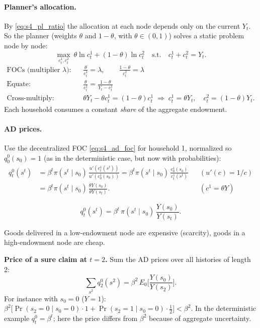 \paragraph{Planner's allocation.} By \eqref{eq:s4_pl_ratio} the allocation at each node depends only on the current $Y_t$. So the planner (weights $\theta$ and $1-\theta$, with $\theta\in(0,1)$) solves a static problem node by node:
\[
\max_{c^1_t,c^2_t}\ \theta\ln c^1_t+(1-\theta)\ln c^2_t\quad\text{s.t.}\quad c^1_t+c^2_t=Y_t .
\]
\begin{align*}
  \text{FOCs (multiplier $\lambda$):}&\quad \frac{\theta}{c^1_t}=\lambda,\qquad \frac{1-\theta}{c^2_t}=\lambda\\
  \text{Equate:}&\quad \frac{\theta}{c^1_t}=\frac{1-\theta}{Y_t-c^1_t}\\
  \text{Cross-multiply:}&\quad \theta Y_t-\theta c^1_t=(1-\theta)c^1_t\;\Rightarrow\; c^1_t=\theta Y_t,\quad c^2_t=(1-\theta)Y_t.
\end{align*}
Each household consumes a constant \emph{share} of the aggregate endowment.

\paragraph{AD prices.} Use the decentralized FOC \eqref{eq:s4_ad_foc} for household 1, normalized so $q^0_0(s_0)=1$ (as in the deterministic case, but now with probabilities):
\begin{align*}
  q^0_t(s^t) &= \beta^t\pi(s^t\mid s_0)\,\frac{u'(c^1_t(s^t))}{u'(c^1_0(s_0))}
  = \beta^t\pi(s^t\mid s_0)\,\frac{c^1_0(s_0)}{c^1_t(s^t)} && (u'(c)=1/c)\\
  &= \beta^t\pi(s^t\mid s_0)\,\frac{\theta Y(s_0)}{\theta Y(s_t)} . && (c^1=\theta Y)
\end{align*}
\begin{keybox}[title=AD prices with log utility]
\[
  q^0_t(s^t) = \beta^t\,\pi(s^t\mid s_0)\,\frac{Y(s_0)}{Y(s_t)} .
\]
\end{keybox}
Goods delivered in a low-endowment node are expensive (scarcity), goods in a high-endowment node are cheap.

\textbf{Price of a sure claim at $t=2$.} Sum the AD prices over all histories of length 2:
\[
  \sum_{s^2}q^0_2(s^2)=\beta^2\,E_0\Big[\frac{Y(s_0)}{Y(s_2)}\Big].
\]
For instance with $s_0=0$ ($Y=1$): $\beta^2\big[\Pr(s_2=0\mid s_0=0)\cdot1+\Pr(s_2=1\mid s_0=0)\cdot\tfrac12\big]<\beta^2$. In the deterministic example $q^0_t=\beta^t$; here the price differs from $\beta^2$ because of aggregate uncertainty.

